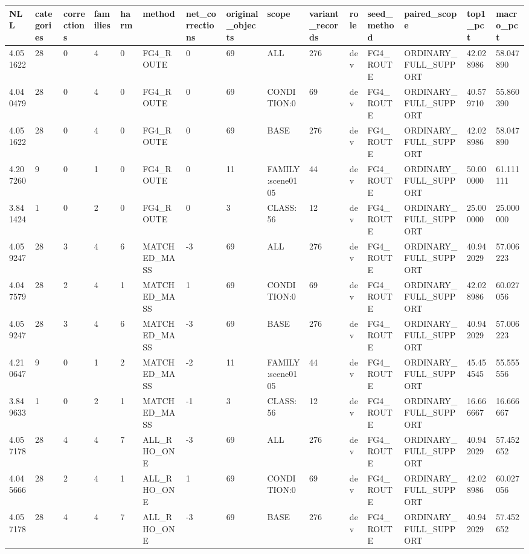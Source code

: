 \begin{tabular}{lllllllllllllll}
\toprule
NLL & categories & corrections & families & harm & method & net\_corrections & original\_objects & scope & variant\_records & role & seed\_method & paired\_scope & top1\_pct & macro\_pct \\
\midrule
4.051622 & 28 & 0 & 4 & 0 & FG4\_ROUTE & 0 & 69 & ALL & 276 & dev & FG4\_ROUTE & ORDINARY\_FULL\_SUPPORT & 42.028986 & 58.047890 \\
4.040479 & 28 & 0 & 4 & 0 & FG4\_ROUTE & 0 & 69 & CONDITION:0 & 69 & dev & FG4\_ROUTE & ORDINARY\_FULL\_SUPPORT & 40.579710 & 55.860390 \\
4.051622 & 28 & 0 & 4 & 0 & FG4\_ROUTE & 0 & 69 & BASE & 276 & dev & FG4\_ROUTE & ORDINARY\_FULL\_SUPPORT & 42.028986 & 58.047890 \\
4.207260 & 9 & 0 & 1 & 0 & FG4\_ROUTE & 0 & 11 & FAMILY:scene0105 & 44 & dev & FG4\_ROUTE & ORDINARY\_FULL\_SUPPORT & 50.000000 & 61.111111 \\
3.841424 & 1 & 0 & 2 & 0 & FG4\_ROUTE & 0 & 3 & CLASS:56 & 12 & dev & FG4\_ROUTE & ORDINARY\_FULL\_SUPPORT & 25.000000 & 25.000000 \\
4.059247 & 28 & 3 & 4 & 6 & MATCHED\_MASS & -3 & 69 & ALL & 276 & dev & FG4\_ROUTE & ORDINARY\_FULL\_SUPPORT & 40.942029 & 57.006223 \\
4.047579 & 28 & 2 & 4 & 1 & MATCHED\_MASS & 1 & 69 & CONDITION:0 & 69 & dev & FG4\_ROUTE & ORDINARY\_FULL\_SUPPORT & 42.028986 & 60.027056 \\
4.059247 & 28 & 3 & 4 & 6 & MATCHED\_MASS & -3 & 69 & BASE & 276 & dev & FG4\_ROUTE & ORDINARY\_FULL\_SUPPORT & 40.942029 & 57.006223 \\
4.210647 & 9 & 0 & 1 & 2 & MATCHED\_MASS & -2 & 11 & FAMILY:scene0105 & 44 & dev & FG4\_ROUTE & ORDINARY\_FULL\_SUPPORT & 45.454545 & 55.555556 \\
3.849633 & 1 & 0 & 2 & 1 & MATCHED\_MASS & -1 & 3 & CLASS:56 & 12 & dev & FG4\_ROUTE & ORDINARY\_FULL\_SUPPORT & 16.666667 & 16.666667 \\
4.057178 & 28 & 4 & 4 & 7 & ALL\_RHO\_ONE & -3 & 69 & ALL & 276 & dev & FG4\_ROUTE & ORDINARY\_FULL\_SUPPORT & 40.942029 & 57.452652 \\
4.045666 & 28 & 2 & 4 & 1 & ALL\_RHO\_ONE & 1 & 69 & CONDITION:0 & 69 & dev & FG4\_ROUTE & ORDINARY\_FULL\_SUPPORT & 42.028986 & 60.027056 \\
4.057178 & 28 & 4 & 4 & 7 & ALL\_RHO\_ONE & -3 & 69 & BASE & 276 & dev & FG4\_ROUTE & ORDINARY\_FULL\_SUPPORT & 40.942029 & 57.452652 \\

\end{tabular}
